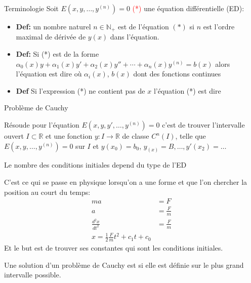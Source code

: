 \begin{parag}{Terminologie}
    Soit $E(x, y, \dots, y^{(n)}) = 0$ \textcolor{red}{(*)} une équation différentielle (ED):
    \begin{itemize}
        \item \textbf{Def:} un nombre naturel $n \in \mathbb{N}_+$ est  de l'équation $(*)$ si $n$ est l'ordre maximal de dérivée de $y(x)$ dans l'équation.
        \item \textbf{Def:} Si (*) est de la forme $\alpha_0(x)y + \alpha_1(x)y' + \alpha_2(x)y'' + \cdots + \alpha_n(x)y^{(n)} = b(x)$ alors l'équation est dire  où $\alpha_i(x)$, $b(x)$ dont des fonctions continues
        \item \textbf{Def} Si l'expression (*) ne contient pas de $x$ l'équation (*) est dire 
    \end{itemize}
\end{parag}
\begin{parag}{Problème de Cauchy}
    \begin{definition}
        Résoude  pour l'équation $E(x, y, y', \dots, y^{(n)}) = 0$ c'est de trouver l'intervalle ouvert $I \subset \mathbb{R}$ et une fonction $y : I \to \mathbb{R}$ de classe $C^n (I)$, telle que $E(x, y, \dots, y^{(n)}) = 0$ sur $I$ et $y(x_0) = b_0$, $y_(x) = B, \dots, y'(x_2) = \dots$
    \end{definition}
    Le nombre des conditions initiales depend du type de l'ED
    \begin{framedremark}
        C'est ce qui se passe en physique lorsqu'on a une forme et que l'on chercher la position au court du temps:
        \begin{align*}
            ma &= F\\
            a &= \frac{F}{m}\\
            \frac{d^2x}{dt^2} &= \frac{F}{m}\\
            x = \frac{1}{2}\frac{F}{m}t^2 + c_1 t + c_0
        \end{align*}
        Et le but est de trouver ses constantes qui sont les conditions initiales.
    \end{framedremark}
    \begin{definition}
        Une solution d'un problème de Cauchy est  si elle est définie sur le plus grand intervalle possible.
    \end{definition}
\end{parag}
